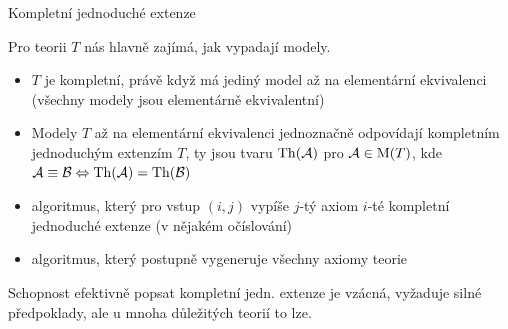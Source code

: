 \documentclass{beamer}
\begin{document}
\begin{frame}{Kompletní jednoduché extenze}

    \vspace{-6pt}

    \pause
    Pro teorii $T$ nás hlavně zajímá, jak vypadají modely.

    \pause
    \vspace{-6pt}
    \begin{itemize}
        \item $T$ je \alert{kompletní}, právě když má jediný model až na elementární ekvivalenci (všechny modely jsou elementárně ekvivalentní)\pause
        \item Modely $T$ až na elementární ekvivalenci jednoznačně odpovídají \alert{kompletním jednoduchým extenzím} $T$, ty jsou tvaru $\operatorname{Th}(\mathcal{A})$ pro $\mathcal{A}\in\operatorname{M}(T)$, kde $\mathcal{A}\equiv\mathcal{B}\Leftrightarrow\operatorname{Th}(\mathcal{A})=\operatorname{Th}(\mathcal{B})$
    \end{itemize}
    
    \pause

    \pause
    
    \pause
    \begin{itemize}
        \item algoritmus, který pro vstup $(i,j)$ vypíše $j$-tý axiom $i$-té kompletní jednoduché extenze (v nějakém očíslování)\pause
        \item algoritmus, který postupně vygeneruje všechny axiomy teorie
    \end{itemize}

    \pause
    Schopnost efektivně popsat kompletní jedn. extenze je vzácná, vyžaduje silné předpoklady, ale u mnoha důležitých teorií to lze. 

\end{frame}
\end{document}
